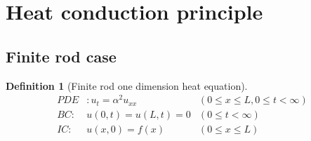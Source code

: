 \documentclass[oneside,11pt,pdftex,final]{book}%
\numberwithin{equation}{section}
\newtheorem{definition}[theorem]{Definition}
\numberwithin{section}{chapter}
\numberwithin{equation}{chapter}
\begin{document}
\section{Heat conduction principle}
\subsection{Finite rod case}
\begin{definition}[Finite rod one dimension heat equation]
	\begin{align*}
		PDE&: u_t=\alpha^2 u_{xx} &(0\leq x \leq L, 0 \leq t < \infty)\\
		BC:& u(0,t)=u(L,t)=0 &(0 \leq t <\infty)\\
		IC:& u(x,0)=f(x) &(0 \leq x	\leq L)
	\end{align*}
\end{definition}
\end{document}
